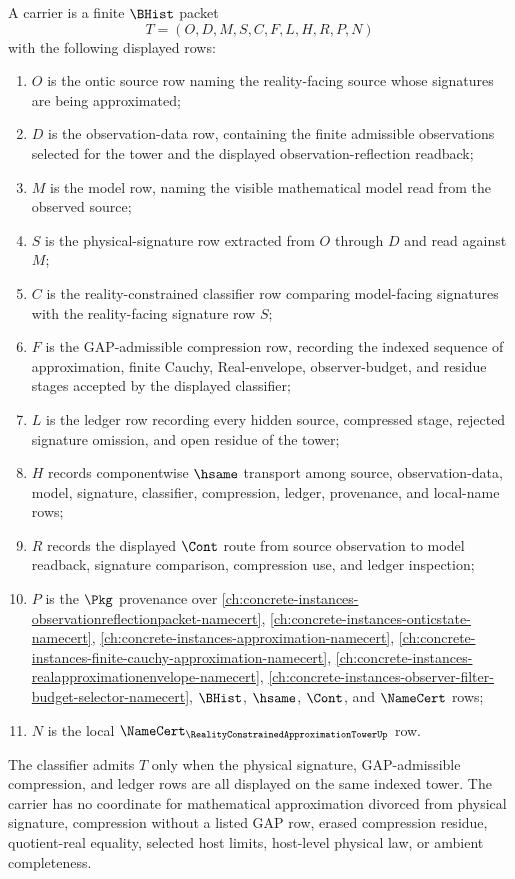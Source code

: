 \begin{definition}
\label{def:reality-constrained-approximation-tower-packet}
A \RealityConstrainedApproximationTowerUp carrier is a finite $\BHist$ packet
$$
T=(O,D,M,S,C,F,L,H,R,P,N)
$$
with the following displayed rows:
\begin{enumerate}
\item $O$ is the ontic source row naming the reality-facing source whose signatures are being approximated;
\item $D$ is the observation-data row, containing the finite admissible observations selected for the tower and the displayed observation-reflection readback;
\item $M$ is the model row, naming the visible mathematical model read from the observed source;
\item $S$ is the physical-signature row extracted from $O$ through $D$ and read against $M$;
\item $C$ is the reality-constrained classifier row comparing model-facing signatures with the reality-facing signature row $S$;
\item $F$ is the GAP-admissible compression row, recording the indexed sequence of approximation, finite Cauchy, Real-envelope, observer-budget, and residue stages accepted by the displayed classifier;
\item $L$ is the ledger row recording every hidden source, compressed stage, rejected signature omission, and open residue of the tower;
\item $H$ records componentwise $\hsame$ transport among source, observation-data, model, signature, classifier, compression, ledger, provenance, and local-name rows;
\item $R$ records the displayed $\Cont$ route from source observation to model readback, signature comparison, compression use, and ledger inspection;
\item $P$ is the $\Pkg$ provenance over \autoref{ch:concrete-instances-observationreflectionpacket-namecert}, \autoref{ch:concrete-instances-onticstate-namecert}, \autoref{ch:concrete-instances-approximation-namecert}, \autoref{ch:concrete-instances-finite-cauchy-approximation-namecert}, \autoref{ch:concrete-instances-realapproximationenvelope-namecert}, \autoref{ch:concrete-instances-observer-filter-budget-selector-namecert}, $\BHist$, $\hsame$, $\Cont$, and $\NameCert$ rows;
\item $N$ is the local $\NameCert_{\RealityConstrainedApproximationTowerUp}$ row.
\end{enumerate}
The classifier admits $T$ only when the physical signature, GAP-admissible compression, and ledger rows are all displayed on the same indexed tower. The carrier has no coordinate for mathematical approximation divorced from physical signature, compression without a listed GAP row, erased compression residue, quotient-real equality, selected host limits, host-level physical law, or ambient completeness.
\end{definition}

